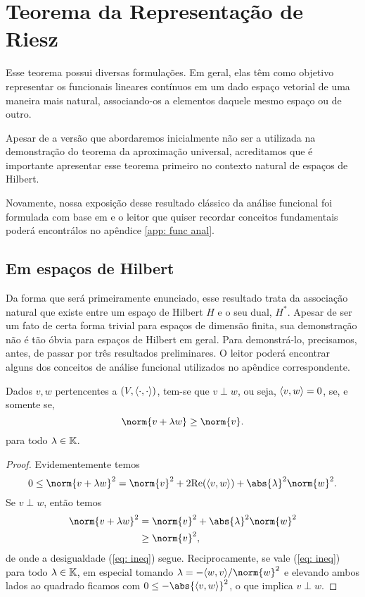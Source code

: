 \section{Teorema da Representação de Riesz}

Esse teorema possui diversas formulações.
Em geral, elas têm como objetivo representar os funcionais lineares contínuos em um dado espaço vetorial de uma maneira mais natural, associando-os a elementos daquele mesmo espaço ou de outro.

Apesar de a versão que abordaremos inicialmente não ser a utilizada na demonstração do teorema da aproximação universal, acreditamos que é importante apresentar esse teorema primeiro no contexto natural de espaços de Hilbert.

Novamente, nossa exposição desse resultado clássico da análise funcional foi formulada com base em \cite{func-anal} e o leitor que quiser recordar conceitos fundamentais poderá encontrálos no apêndice \ref{app: func anal}.

\subsection{Em espaços de Hilbert}

Da forma que será primeiramente enunciado, esse resultado trata da associação natural que existe entre um espaço de Hilbert \( H \) e o seu dual, \( H^{ * } \). Apesar de ser um fato de certa forma trivial para espaços de dimensão finita, sua demonstração não é tão óbvia para espaços de Hilbert em geral.
Para demonstrá-lo, precisamos, antes, de passar por três resultados preliminares.
O leitor poderá encontrar alguns dos conceitos de análise funcional utilizados no apêndice correspondente.

\begin{lem}
    Dados \( v, w \) pertencentes a \( (V, \langle\cdot,\cdot\rangle) \), tem-se que \( v \perp w \), ou seja, \( \langle v,w\rangle = 0 \), se, e somente se,
    \begin{equation}
        \norm{ v + \lambda w } \geq \norm{ v }
        \label{eq: ineq}
    .\end{equation}
    para todo \( \lambda \in \mathbb{K} \).
    \label{lem: perp_equiv}
\end{lem}
\begin{proof}
    Evidementemente temos \[
        0
        \leq \norm{ v + \lambda w }^2
        = \norm{ v }^2 + 2 \Re (\dotprod{v,w}) + \abs{ \lambda }^2 \norm{ w }^2
    .\]
    Se \( v \perp w \), então temos
    \begin{align*}
        \norm{ v + \lambda w }^2
        &= \norm{ v }^2 + \abs{ \lambda }^2 \norm{ w }^2 \\
        &\geq \norm{ v }^2
    ,\end{align*}
    de onde a desigualdade (\ref{eq: ineq}) segue.
    Reciprocamente, se vale (\ref{eq: ineq}) para todo \( \lambda \in \mathbb{K} \), em especial tomando \( \lambda = -\dotprod{w,v}/ \norm{ w }^2 \) e elevando ambos lados ao quadrado ficamos com \( 0 \leq - \abs{ \dotprod{v,w} }^2 \), o que implica \( v \perp w \).
\end{proof}

